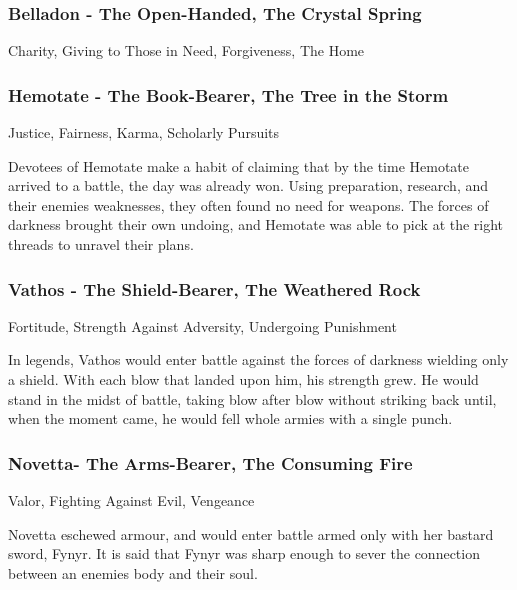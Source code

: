 \subsubsection{Belladon - The Open-Handed, The Crystal Spring}

\vspace{2mm}

Charity, Giving to Those in Need, Forgiveness, The Home


\subsubsection{Hemotate - The Book-Bearer, The Tree in the Storm}

\vspace{2mm}

Justice, Fairness, Karma, Scholarly Pursuits

Devotees of Hemotate make a habit of claiming that by the time Hemotate arrived to a battle, the day was already won. Using preparation, research, and their enemies weaknesses, they often found no need for weapons. The forces of darkness brought their own undoing, and Hemotate was able to pick at the right threads to unravel their plans.

\subsubsection{Vathos - The Shield-Bearer, The Weathered Rock}

\vspace{2mm}

Fortitude, Strength Against Adversity, Undergoing Punishment

In legends, Vathos would enter battle against the forces of darkness wielding only a shield. With each blow that landed upon him, his strength grew. He would stand in the midst of battle, taking blow after blow without striking back until, when the moment came, he would fell whole armies with a single punch.

\subsubsection{Novetta- The Arms-Bearer, The Consuming Fire}

\vspace{2mm}

Valor, Fighting Against Evil, Vengeance

Novetta eschewed armour, and would enter battle armed only with her bastard sword, Fynyr. It is said that Fynyr was sharp enough to sever the connection between an enemies body and their soul.

